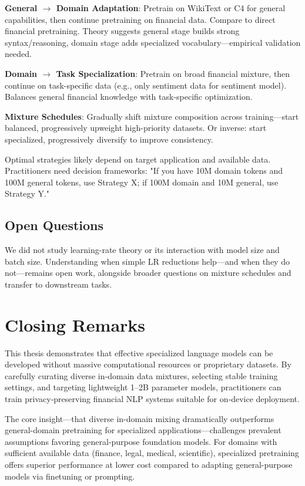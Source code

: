 \textbf{General $\rightarrow$ Domain Adaptation}: Pretrain on WikiText or C4 for general capabilities, then continue pretraining on financial data. Compare to direct financial pretraining. Theory suggests general stage builds strong syntax/reasoning, domain stage adds specialized vocabulary—empirical validation needed.

\textbf{Domain $\rightarrow$ Task Specialization}: Pretrain on broad financial mixture, then continue on task-specific data (e.g., only sentiment data for sentiment model). Balances general financial knowledge with task-specific optimization.

\textbf{Mixture Schedules}: Gradually shift mixture composition across training—start balanced, progressively upweight high-priority datasets. Or inverse: start specialized, progressively diversify to improve consistency.

Optimal strategies likely depend on target application and available data. Practitioners need decision frameworks: "If you have 10M domain tokens and 100M general tokens, use Strategy X; if 100M domain and 10M general, use Strategy Y."

\subsection{Open Questions}

We did not study learning-rate theory or its interaction with model size and batch size. Understanding when simple LR reductions help—and when they do not—remains open work, alongside broader questions on mixture schedules and transfer to downstream tasks.

\section{Closing Remarks}

This thesis demonstrates that effective specialized language models can be developed without massive computational resources or proprietary datasets. By carefully curating diverse in‑domain data mixtures, selecting stable training settings, and targeting lightweight 1–2B parameter models, practitioners can train privacy‑preserving financial NLP systems suitable for on‑device deployment.

The core insight—that diverse in-domain mixing dramatically outperforms general-domain pretraining for specialized applications—challenges prevalent assumptions favoring general-purpose foundation models. For domains with sufficient available data (finance, legal, medical, scientific), specialized pretraining offers superior performance at lower cost compared to adapting general-purpose models via finetuning or prompting.

